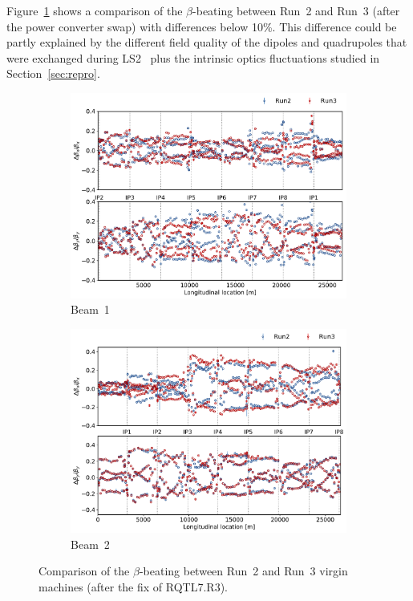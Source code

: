 \documentclass[a4paper]{cernatsnote}
\begin{document}
Figure~\ref{fig:after_swap_vs_2016} shows a comparison of the $\beta$-beating between Run~2 and Run~3 (after the power converter swap) with differences below 10\%. This difference could be partly explained by the different field quality of the dipoles and quadrupoles that were exchanged during LS2~\cite{LS2} plus the intrinsic optics fluctuations studied in Section~\ref{sec:repro}. 

\begin{figure}[ht]
\begin{subfigure}{.5\textwidth}
  \centering
  \includegraphics[width=.99\linewidth]{plots/beam1/beta_beat_2016_2021_swap_fixed.pdf}   
  \caption{Beam~1}
\end{subfigure}
\begin{subfigure}{.5\textwidth}
  \centering
  \includegraphics[width=.99\linewidth]{plots/beam2/B2_BetaBeat_afterIR3Q7fix_vs_virgin2016.pdf}
  \caption{Beam~2}
\end{subfigure}
\caption{Comparison of the $\beta$-beating between Run~2 and Run~3 virgin machines (after the fix of RQTL7.R3).}
\label{fig:after_swap_vs_2016}
\end{figure}
\end{document}
